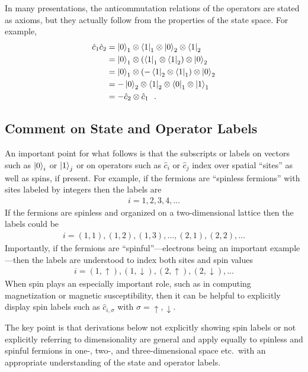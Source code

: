 \documentclass[aps, superscriptaddress, floatfix, onecolumn]{revtex4-2}
\begin{document}
In many presentations, the anticommutation relations of the operators are stated as axioms, but they actually follow from the properties of the state space.
For example, 
\begin{align}
\hat{c}_1  \hat{c}_2   & =  \ket{0}_1 \otimes \bra{1}_1 \otimes \ket{0}_2 \otimes \bra{1}_2 \nonumber \\
& =  \ket{0}_1 \otimes (\bra{1}_1  \otimes \bra{1}_2) \otimes \ket{0}_2 \nonumber \\
& = \ket{0}_1 \otimes ( - \bra{1}_2  \otimes \bra{1}_1) \otimes \ket{0}_2 \nonumber \\
& = - \ket{0}_2 \otimes \bra{1}_2  \otimes \bra{0}_1 \otimes \ket{1}_1 \nonumber \\
& = - \hat{c}_2  \otimes \hat{c}_1 \ \ .
\end{align}

\subsection{Comment on State and Operator Labels}

An important point for what follows is that the subscripts or labels on vectors such as $\ket{0}_i$ or $\ket{1}_j$ or on operators such as $\hat{c}_i$ or $\hat{c}_j$ index over spatial ``sites'' as well as spins, if present. For example, if the fermions are ``spinless fermions'' with sites labeled by integers then the labels are
\begin{align}
i = 1, 2, 3,  4, \ldots
\end{align}
If the fermions are spinless and organized on a two-dimensional lattice then the labels could be
\begin{align}
i = (1,1), (1,2), (1,3), \ldots, (2,1), (2,2), \ldots
\end{align}
Importantly, if the fermions are ``spinful''---electrons being an important example---then the labels are understood to index both sites and spin values
\begin{align}
i = (1,\uparrow), (1,\downarrow), (2,\uparrow), (2, \downarrow), \ldots 
\end{align}
When spin plays an especially important role, such as in computing magnetization or magnetic susceptibility, then it can be helpful to explicitly display spin labels 
such as $\hat{c}_{i,\sigma}$ with $\sigma = \uparrow, \downarrow$.

The key point is that derivations below not explicitly showing spin labels or not explicitly referring to dimensionality are general and apply equally to spinless and spinful fermions in one-, two-, and three-dimensional space etc.\ with an appropriate understanding of the state and operator labels.
\end{document}
